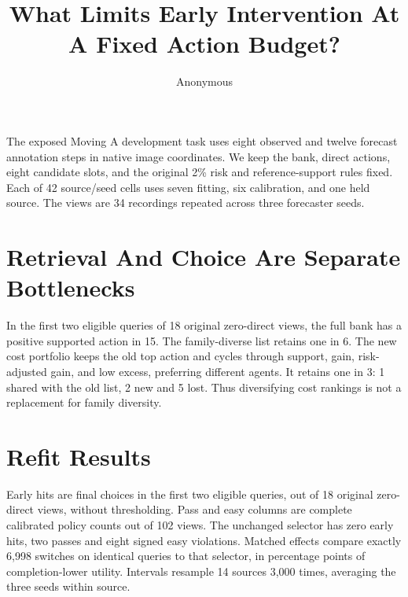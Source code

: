 \documentclass[10pt,onecolumn,letterpaper]{article}
\title{What Limits Early Intervention At A Fixed Action Budget?}\author{Anonymous}
\begin{document}
\raggedbottom\maketitle
The exposed Moving A development task uses eight observed and twelve forecast annotation steps in native image coordinates. We keep the bank, direct actions, eight candidate slots, and the original 2\% risk and reference-support rules fixed. Each of 42 source/seed cells uses seven fitting, six calibration, and one held source. The views are 34 recordings repeated across three forecaster seeds.


\section{Retrieval And Choice Are Separate Bottlenecks}

In the first two eligible queries of 18 original zero-direct views, the full bank has a positive supported action in 15. The family-diverse list retains one in 6. The new cost portfolio keeps the old top action and cycles through support, gain, risk-adjusted gain, and low excess, preferring different agents. It retains one in 3: 1 shared with the old list, 2 new and 5 lost. Thus diversifying cost rankings is not a replacement for family diversity.


\section{Refit Results}

Early hits are final choices in the first two eligible queries, out of 18 original zero-direct views, without thresholding. Pass and easy columns are complete calibrated policy counts out of 102 views. The unchanged selector has zero early hits, two passes and eight signed easy violations. Matched effects compare exactly 6,998 switches on identical queries to that selector, in percentage points of completion-lower utility. Intervals resample 14 sources 3,000 times, averaging the three seeds within source.
\end{document}
